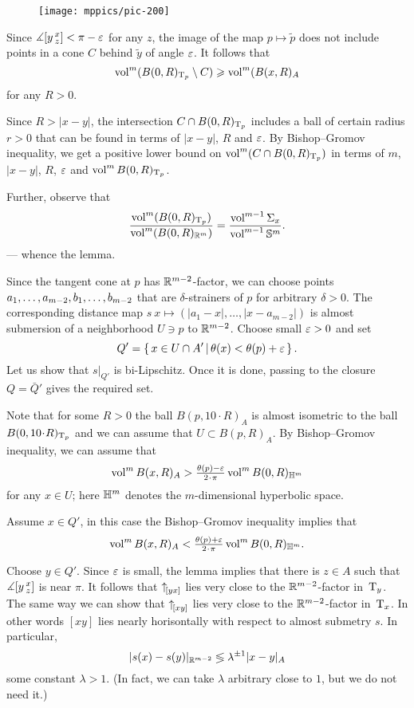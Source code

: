 \begin{wrapfigure}{r}{35 mm}
\vskip-0mm
\centering
\texttt{[image: mppics/pic-200]}
\vskip0mm
\end{wrapfigure}

Since $\measuredangle[y\,{}^{x}_{z}]<\pi-\varepsilon$ for any $z$, the image of the map $p\mapsto \tilde p$ does not include points in a cone $C$ behind $\tilde y$ of angle $\varepsilon$.
It follows that 
\[\operatorname{vol}^m(B(0,R)_{\mathrm{T}_p}\setminus C)\geqslant \operatorname{vol}^m(B(x,R)_A\]
for any $R>0$.

Since $R>|x-y|$, the intersection $C\cap B(0,R)_{\mathrm{T}_p}$ includes a ball of certain radius $r>0$ that can be found in terms of $|x-y|$, $R$ and $\varepsilon$.
By Bishop--Gromov inequality, we get a positive lower bound on $\operatorname{vol}^m(C\cap B(0,R)_{\mathrm{T}_p})$ in terms of $m$, $|x-y|$, $R$, $\varepsilon$ and $\operatorname{vol}^mB(0,R)_{\mathrm{T}_p}$.

Further, observe that 
\[\frac{\operatorname{vol}^m(B(0,R)_{\mathrm{T}_p})}{\operatorname{vol}^m(B(0,R)_{\mathbb{R}^m})}
=
\frac{\operatorname{vol}^{m-1} \Sigma_x}{\operatorname{vol}^{m-1} \mathbb{S}^m}.
\]
--- whence the lemma.
\qeds







Since the tangent cone at $p$ has $\mathbb{R}^{m-2}$-factor, 
we can choose points $a_1,\zz\dots,a_{m-2},b_1,\zz\dots,b_{m-2}$ that are $\delta$-strainers of $p$ for arbitrary $\delta>0$.
The corresponding distance map $s\:x\mapsto (|a_1-x|,\dots,|x-a_{m-2}|)$ is almost submersion of a neighborhood $U\ni p$ to $\mathbb{R}^{m-2}$.
Choose small $\varepsilon>0$ and set 
\[Q'=\left\{\,x\in U\cap A'\,\middle|\,\theta(x)<\theta(p)+\varepsilon\,\right\}.\]
Let us show that $s|_{Q'}$ is bi-Lipschitz.
Once it is done, passing to the closure $Q=\bar Q'$ gives the required set. 

Note that for some $R>0$ the ball $B(p,10\cdot R)_A$ is almost isometric to the ball $B(0,10\cdot R)_{\T_p}$
and we can assume that $U\subset B(p,R)_A$.
By Bishop--Gromov inequality, we can assume that 
\[\vol^m B(x,R)_A>\tfrac{\theta(p)-\eps}{2\cdot \pi}\vol^m B(0,R)_{\HH^m}\]
for any $x\in U$; here $\mathbb{H}^m$ denotes the $m$-dimensional hyperbolic space. 

Assume $x\in Q'$, in this case the Bishop--Gromov inequality implies that 
\[\vol^m B(x,R)_A< \tfrac{\theta(p)+\eps}{2\cdot \pi}\vol^m B(0,R)_{\HH^m}.\]

Choose $y\in Q'$.
Since $\varepsilon$ is small, the lemma implies that there is $z\in A$ such that $\measuredangle[y\,{}^{x}_{z}]$ is near $\pi$.
It follows that ${\uparrow}_{\hskip-0.15em[{y}{x}]}$ lies very close to the $\mathbb{R}^{m-2}$-factor in~$\mathrm{T}_y$.
The same way we can show that ${\uparrow}_{\hskip-0.15em[{x}{y}]}$ lies very close to the $\mathbb{R}^{m-2}$-factor in~$\mathrm{T}_x$.
In other words $[xy]$ lies nearly horisontally with respect to almost submetry $s$.
In particular,  
\[|s(x)-s(y)|_{\mathbb{R}^{m-2}} \lessgtr \lambda^{\pm1}|x-y|_{A}\]
some constant $\lambda>1$.
(In fact, we can take $\lambda$ arbitrary close to $1$, but we do not need it.)
\qeds
